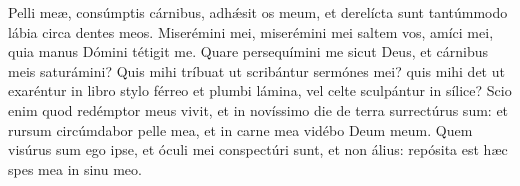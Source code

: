 Pelli meæ, consúmptis cárnibus, adhǽsit os meum,
	et derelícta sunt tantúmmodo lábia circa dentes meos.
Miserémini mei, miserémini mei saltem vos, amíci mei,
	quia manus Dómini tétigit me.
Quare persequímini me sicut Deus,
	et cárnibus meis saturámini?
Quis mihi tríbuat ut scribántur sermónes mei?
	quis mihi det ut exaréntur in libro stylo férreo et plumbi lámina,
	vel celte sculpántur in sílice?
Scio enim quod redémptor meus vivit,
	et in novíssimo die de terra surrectúrus sum:
	et rursum circúmdabor pelle mea, et in carne mea vidébo Deum meum.
Quem visúrus sum ego ipse, et óculi mei conspectúri sunt, et non álius:
	repósita est hæc spes mea in sinu meo.
